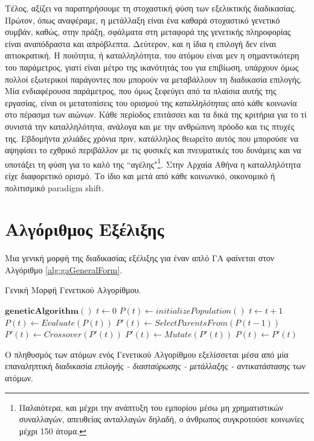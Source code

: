 Τέλος, αξίζει να παρατηρήσουμε τη στοχαστική φύση των εξελικτικής διαδικασίας. Πρώτον, όπως αναφέραμε, η μετάλλαξη είναι ένα καθαρά στοχαστικό γενετικό συμβάν, καθώς, στην πράξη, σφάλματα στη μεταφορά της γενετικής πληροφορίας είναι αναπόδραστα και απρόβλεπτα. Δεύτερον, και η ίδια η επιλογή δεν είναι αιτιοκρατική. Η ποιότητα, ή καταλληλότητα, του ατόμου είναι μεν η σημαντικότερη του παράμετρος, γιατί είναι μέτρο της ικανότητάς του για επιβίωση, υπάρχουν όμως πολλοί εξωτερικοί παράγοντες που μπορούν να μεταβάλλουν τη διαδικασία επιλογής. Μία ενδιαφέρουσα παράμετρος, που όμως ξεφεύγει από τα πλαίσια αυτής της εργασίας, είναι οι μετατοπίσεις του ορισμού της \emph{καταλληλότητας} από κάθε κοινωνία στο πέρασμα των αιώνων. Κάθε περίοδος επιτάσσει και τα δικά της κριτήρια για το τί συνιστά την καταλληλότητα, ανάλογα και με την ανθρώπινη πρόοδο και τις πτυχές της. Εβδομήντα χιλιάδες χρόνια πριν, κατάλληλος θεωρείτο αυτός που μπορούσε να αψηφίσει το εχθρικό περιβάλλον με τις φυσικές και πνευματικές του δυνάμεις και να υποτάξει τη φύση για το καλό της “αγέλης"\footnote{Παλαιότερα, και μέχρι την ανάπτυξη του εμπορίου μέσω μη χρηματιστικών συναλλαγών, απευθείας ανταλλαγών δηλαδή, ο άνθρωπος συγκροτούσε κοινωνίες μέχρι 150 άτομα.}. Στην Αρχαία Αθήνα η καταλληλότητα είχε διαφορετικό ορισμό. Το ίδιο και μετά από κάθε κοινωνικό, οικονομικό ή πολιτισμικό paradigm shift.


\section{Αλγόριθμος Εξέλιξης}
Μια γενική μορφή της διαδικασίας εξέλιξης για έναν απλό ΓΑ φαίνεται στον Αλγόριθμο \ref{alg:gaGeneralForm}.

\begin{algorithm}
\caption{Γενική Μορφή Γενετικού Αλγορίθμου.}
\label{alg:gaGeneralForm}
\begin{algorithmic}[1]
\STATE $\textbf{geneticAlgorithm}()$
\STATE $t \gets 0$
\STATE $P(t) \gets initializePopulation()$
  	\STATE $t \gets t+1$
  	\STATE $P(t) \gets Evaluate(P(t))$
	\STATE $P'(t) \gets SelectParentsFrom(P(t-1))$
	\STATE $P'(t) \gets Crossover(P'(t))$
	\STATE $P'(t) \gets Mutate(P'(t))$
	\STATE $P(t) \gets P'(t)$
\ENDWHILE
\end{algorithmic}
\end{algorithm}

Ο πληθυσμός των ατόμων ενός Γενετικού Αλγορίθμου εξελίσσεται μέσα από μία επαναληπτική διαδικασία \emph{επιλογής - διασταύρωσης - μετάλλαξης - αντικατάστασης} των ατόμων. 

